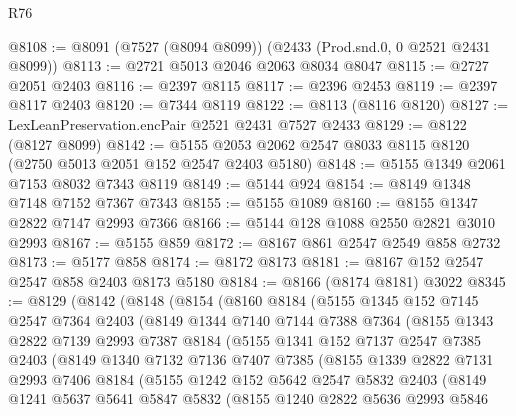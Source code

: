 \begin{lexlean}{R76}
\begin{coremodule}
@8108 := @8091 (@7527 (@8094 @8099)) (@2433 (Prod.snd.{0, 0} @2521 @2431 @8099))
@8113 := @2721 @5013 @2046 @2063 @8034 @8047
@8115 := @2727 @2051 @2403
@8116 := @2397 @8115
@8117 := @2396 @2453
@8119 := @2397 @8117 @2403
@8120 := @7344 @8119
@8122 := @8113 (@8116 @8120)
@8127 := LexLeanPreservation.encPair @2521 @2431 @7527 @2433
@8129 := @8122 (@8127 @8099)
@8142 := @5155 @2053 @2062 @2547 @8033 @8115 @8120 (@2750 @5013 @2051 @152 @2547 @2403 @5180)
@8148 := @5155 @1349 @2061 @7153 @8032 @7343 @8119
@8149 := @5144 @924
@8154 := @8149 @1348 @7148 @7152 @7367 @7343
@8155 := @5155 @1089
@8160 := @8155 @1347 @2822 @7147 @2993 @7366
@8166 := @5144 @128 @1088 @2550 @2821 @3010 @2993
@8167 := @5155 @859
@8172 := @8167 @861 @2547 @2549 @858 @2732
@8173 := @5177 @858
@8174 := @8172 @8173
@8181 := @8167 @152 @2547 @2547 @858 @2403 @8173 @5180
@8184 := @8166 (@8174 @8181) @3022
@8345 := @8129
    (@8142
      (@8148
        (@8154
          (@8160
            @8184
            (@5155
              @1345
              @152
              @7145
              @2547
              @7364
              @2403
              (@8149
                @1344
                @7140
                @7144
                @7388
                @7364
                (@8155
                  @1343
                  @2822
                  @7139
                  @2993
                  @7387
                  @8184
                  (@5155
                    @1341
                    @152
                    @7137
                    @2547
                    @7385
                    @2403
                    (@8149
                      @1340
                      @7132
                      @7136
                      @7407
                      @7385
                      (@8155
                        @1339
                        @2822
                        @7131
                        @2993
                        @7406
                        @8184
                        (@5155
                          @1242
                          @152
                          @5642
                          @2547
                          @5832
                          @2403
                          (@8149
                            @1241
                            @5637
                            @5641
                            @5847
                            @5832
                            (@8155
                              @1240
                              @2822
                              @5636
                              @2993
                              @5846

\end{coremodule}
\end{lexlean}
